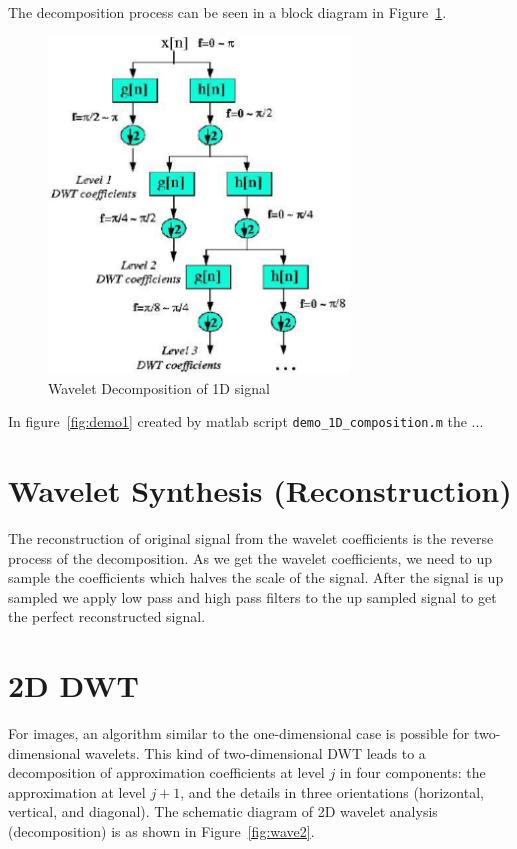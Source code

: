 \documentclass[a4paper,12pt]{article}
\begin{document}
The decomposition process can be seen in a block diagram in Figure~\ref{fig:wave1}.

\begin{figure}[t]
        \centering
        \includegraphics[width=8cm]{diagram.png}
        \caption{Wavelet Decomposition of 1D signal}
		\label{fig:wave1}
\end{figure}

In figure~\ref{fig:demo1} created by matlab script \texttt{demo\_1D\_composition.m} the ...






\section{Wavelet Synthesis (Reconstruction)}
The reconstruction of original signal from the wavelet coefficients is the reverse process of the decomposition. As we get the wavelet coefficients, we need to up sample the coefficients which halves the scale of the signal. After the signal is up sampled we apply low pass and high pass filters to the up sampled signal to get the perfect reconstructed signal.



\section{2D DWT}
For images, an algorithm similar to the one-dimensional case is possible for two-dimensional wavelets. This kind of two-dimensional DWT leads to a decomposition of approximation coefficients at level $j$ in four components: the approximation at level $j+1$, and the details in three orientations (horizontal, vertical, and diagonal). The schematic diagram of 2D wavelet analysis (decomposition) is as shown in Figure~\ref{fig:wave2}.
\end{document}
